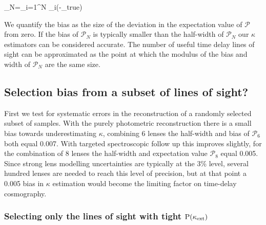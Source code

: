 \documentclass[useAMS,usenatbib]{mn2e}
\begin{document}
\be
\label{eq:bias}
_N=\prod_{i=1}^N \pr_i(\kappa-\kappa_{\rm true})
\ee

We quantify the bias as the size of the deviation in the expectation value of $\mathcal{P}$ from zero. If the bias of $\mathcal{P}_N$ is typically smaller than the half-width of $\mathcal{P}_N$ our $\kappa$ estimators can be considered accurate. The number of useful time delay lines of sight can be approximated as the point at which the modulus of the bias and width of $\mathcal{P}_N$ are the same size.

\subsection{Selection bias from a subset of lines of sight?}

First we test for systematic errors in the reconstruction of a randomly
selected subset of samples. With the purely photometric reconstruction
there is a small bias towards underestimating $\kappa$,  combining 6
lenses the half-width and bias of $\mathcal{P}_{6}$ both equal 0.007.
With targeted spectroscopic follow up this improves slightly, for the
combination of 8 lenses the half-width and expectation value 
$\mathcal{P}_{8}$ equal 0.005. Since strong lens modelling uncertainties
are typically at the 3\% level, several hundred lenses are needed to
reach this level of precision, but at that point a 0.005 bias in
$\kappa$ estimation would become the limiting factor on time-delay
cosmography.


\subsubsection{Selecting only the lines of sight with tight ${\rm P}(\kappa_{\rm ext})$}
\label{sec:tightPDF}
\end{document}
